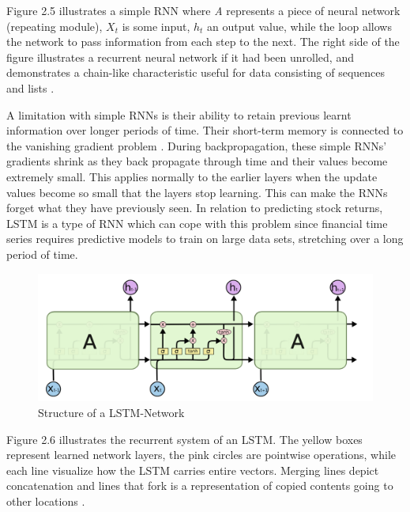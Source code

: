\indent\newline 
Figure 2.5 illustrates a simple RNN where \textit{A} represents a piece of neural network (repeating module), $X_{t}$ is some input, $h_{t}$ an output value, while the loop allows the network to pass information from each step to the next. The right side of the figure illustrates a recurrent neural network if it had been unrolled, and demonstrates a chain-like characteristic useful for data consisting of sequences and lists \cite{olah}.    

\indent\newline 
A limitation with simple RNNs is their ability to retain previous learnt information over longer periods of time. Their short-term memory is connected to the vanishing gradient problem \cite{phi}. During backpropagation, these simple RNNs' gradients shrink as they back propagate through time and their values become extremely small. This applies normally to the earlier layers when the update values become so small that the layers stop learning. This can make the RNNs forget what they have previously seen. In relation to predicting stock returns, LSTM is a type of RNN which can cope with this problem since financial time series requires predictive models to train on large data sets, stretching over a long period of time. 
\indent\newline 
\begin{figure}[H]
\centering
\includegraphics [scale=0.40,angle=360]{figures/lstm.png}
\caption{Structure of a LSTM-Network \cite{olah}}
\label{fig:lstm}
\end{figure}

\indent\newline 
Figure 2.6 illustrates the recurrent system of an LSTM. The yellow boxes represent learned network layers, the pink circles are pointwise operations, while each line visualize how the LSTM carries entire vectors. Merging lines depict concatenation and lines that fork is a representation of copied contents going to other locations \cite{olah}. 

